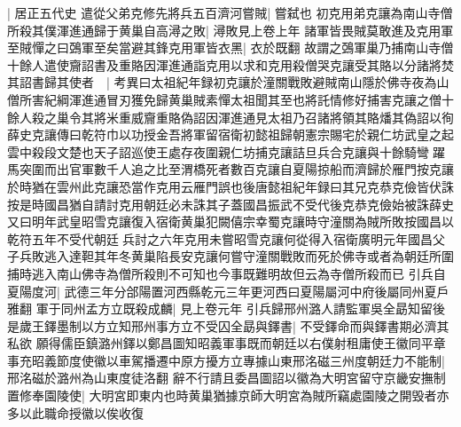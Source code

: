 |{
	居正五代史}
遣從父弟克修先將兵五百濟河嘗賊|{
	嘗弑也}
初克用弟克讓為南山寺僧所殺其僕渾進通歸于黄巢自高潯之敗|{
	潯敗見上卷上年}
諸軍皆畏賊莫敢進及克用軍至賊憚之曰鵶軍至矣當避其鋒克用軍皆衣黑|{
	衣於既翻}
故謂之鵶軍巢乃捕南山寺僧十餘人遣使齎詔書及重賂因渾進通詣克用以求和克用殺僧哭克讓受其賂以分諸將焚其詔書歸其使者　|{
	考異曰太祖紀年録初克讓於潼關戰敗避賊南山隱於佛寺夜為山僧所害紀綱渾進通冒刃獲免歸黄巢賊素憚太祖聞其至也將託情修好捕害克讓之僧十餘人殺之巢令其將米重威齎重賂偽詔因渾進通見太祖乃召諸將領其賂燔其偽詔以徇薛史克讓傳曰乾符巾以功授金吾將軍留宿衛初懿祖歸朝憲宗賜宅於親仁坊武皇之起雲中殺段文楚也天子詔巡使王處存夜圍親仁坊捕克讓詰旦兵合克讓與十餘騎彎躍馬突圍而出官軍數千人追之比至渭橋死者數百克讓自夏陽掠船而濟歸於雁門按克讓於時猶在雲州此克讓恐當作克用云雁門誤也後唐懿祖紀年録曰其兄克恭克儉皆伏誅按是時國昌猶自請討克用朝廷必未誅其子蓋國昌振武不受代後克恭克儉始被誅薛史又曰明年武皇昭雪克讓復入宿衛黄巢犯闕僖宗幸蜀克讓時守潼關為賊所敗按國昌以乾符五年不受代朝廷兵討之六年克用未嘗昭雪克讓何從得入宿衛廣明元年國昌父子兵敗逃入達靼其年冬黄巢陷長安克讓何嘗守潼關戰敗而死於佛寺或者為朝廷所圍捕時逃入南山佛寺為僧所殺則不可知也今事既難明故但云為寺僧所殺而已}
引兵自夏陽度河|{
	武德三年分郃陽置河西縣乾元三年更河西曰夏陽屬河中府後屬同州夏戶雅翻}
軍于同州孟方立既殺成麟|{
	見上卷元年}
引兵歸邢州潞人請監軍吳全勗知留後是歲王鐸墨制以方立知邢州事方立不受囚全勗與鐸書|{
	不受鐸命而與鐸書期必濟其私欲}
願得儒臣鎮潞州鐸以鄭昌圖知昭義軍事既而朝廷以右僕射租庸使王徽同平章事充昭義節度使徽以車駕播遷中原方擾方立專據山東邢洺磁三州度朝廷力不能制|{
	邢洺磁於潞州為山東度徒洛翻}
辭不行請且委昌圖詔以徽為大明宮留守京畿安撫制置修奉園陵使|{
	大明宮即東内也時黄巢猶據京師大明宮為賊所竊處園陵之開毁者亦多以此職命授徽以俟收復}
